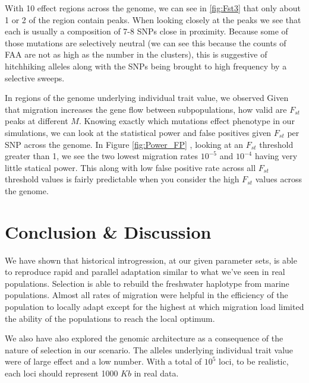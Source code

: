 \documentclass{article}
\begin{document}
With 10 effect regions across the genome, we can see in \ref{fig:Fst3} that only about 1 or 2 of the region contain peaks. 
When looking closely at the peaks we see that each is usually a composition of 7-8 SNPs close in proximity.
Because some of those mutations are selectively neutral (we can see this because the counts of FAA are not as high as the number in the clusters),
this is suggestive of hitchhiking alleles along with the SNPs being brought to high frequency by a selective sweeps.


In regions of the genome underlying individual trait value, we observed 
Given that migration increases the gene flow between subpopulations, how valid are $F_{st}$ peaks at different $M$. 
Knowing exactly which mutations effect phenotype in our simulations, 
we can look at the statistical power and false positives given $F_{st}$ per SNP across the genome. 
In Figure \ref{fig:Power_FP} , looking at an $F_{st}$ threshold greater than 1, we see the two lowest migration rates $10^{-5}$ and $10^{-4}$ having very little statical power. 
This along with low false positive rate across all $F_{st}$ threshold values is fairly predictable when you consider the high $F_{st}$ values across the genome. 


\section{Conclusion \& Discussion}

We have shown that historical introgression, at our given parameter sets,
is able to reproduce rapid and parallel adaptation similar to what we've seen in real populations.
Selection is able to rebuild the freshwater haplotype from marine populations.
Almost all rates of migration were helpful in the efficiency of the population to locally adapt except for the highest at which migration load 
limited the ability of the populations to reach the local optimum. 

We also have also explored the genomic architecture as a consequence of the nature of selection in our scenario. 
The alleles underlying individual trait value were of large effect and a low number. 
With a total of $10^{5}$ loci, to be realistic, each loci should represent 1000 $Kb$ in real data.
\end{document}
